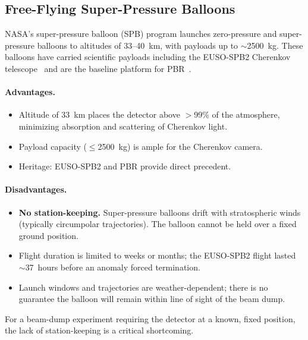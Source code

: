 \documentclass[11pt]{article}
\begin{document}
\subsection{Free-Flying Super-Pressure Balloons}
\label{sec:spb}

NASA's super-pressure balloon (SPB) program launches zero-pressure and
super-pressure balloons to altitudes of 33--40~km, with payloads up
to $\sim$2500~kg.  These balloons have carried scientific payloads
including the EUSO-SPB2 Cherenkov telescope~\cite{EUSO-SPB2-CT,EUSO-SPB2-mission}
and are the baseline platform for PBR~\cite{PBR-mission}.

\paragraph{Advantages.}
\begin{itemize}[nosep]
  \item Altitude of 33~km places the detector above $>$99\% of the atmosphere,
        minimizing absorption and scattering of Cherenkov light.
  \item Payload capacity ($\leq$2500~kg) is ample for the Cherenkov camera.
  \item Heritage: EUSO-SPB2 and PBR provide direct precedent.
\end{itemize}

\paragraph{Disadvantages.}
\begin{itemize}[nosep]
  \item \textbf{No station-keeping.}  Super-pressure balloons drift with
        stratospheric winds (typically circumpolar trajectories).  The balloon
        cannot be held over a fixed ground position.
  \item Flight duration is limited to weeks or months; the EUSO-SPB2
        flight lasted $\sim$37~hours before an anomaly forced termination.
  \item Launch windows and trajectories are weather-dependent; there is no
        guarantee the balloon will remain within line of sight of the beam dump.
\end{itemize}

For a beam-dump experiment requiring the detector at a known, fixed position,
the lack of station-keeping is a critical shortcoming.
\end{document}
